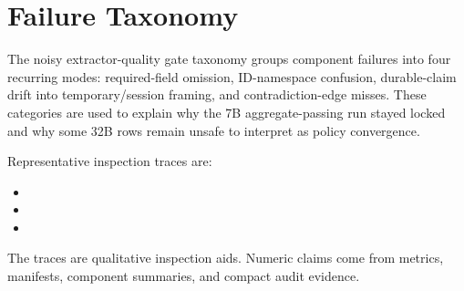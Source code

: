 \section{Failure Taxonomy}

The noisy extractor-quality gate taxonomy groups component
failures into four recurring modes:
required-field omission, ID-namespace confusion, durable-claim drift into
temporary/session framing, and contradiction-edge misses. These categories are
used to explain why the 7B aggregate-passing run stayed locked and why some
32B rows remain unsafe to interpret as policy convergence.

Representative inspection traces are:

\begin{itemize}
\item {}
\item {}
\item {}
\end{itemize}

The traces are qualitative inspection aids. Numeric claims come from metrics,
manifests, component summaries, and compact audit evidence.
